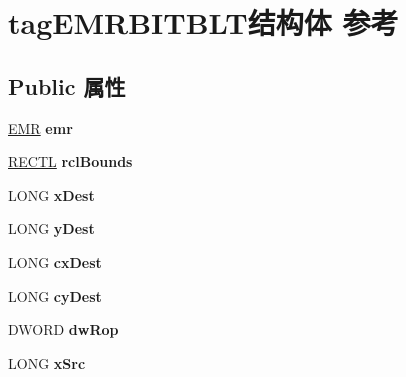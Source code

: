 \hypertarget{structtag_e_m_r_b_i_t_b_l_t}{}\section{tag\+E\+M\+R\+B\+I\+T\+B\+L\+T结构体 参考}
\label{structtag_e_m_r_b_i_t_b_l_t}
\subsection*{Public 属性}
\begin{DoxyCompactItemize}
\item 
\mbox{\label{structtag_e_m_r_b_i_t_b_l_t_a74261e410f52de9b388ad9c92cc4d5d7}} 
\hyperlink{structtag_e_m_r}{E\+MR} {\bfseries emr}
\item 
\mbox{\label{structtag_e_m_r_b_i_t_b_l_t_a687ec289cdd882b8f9afe67e27a450c8}} 
\hyperlink{struct___r_e_c_t_l}{R\+E\+C\+TL} {\bfseries rcl\+Bounds}
\item 
\mbox{\label{structtag_e_m_r_b_i_t_b_l_t_a88c92524c76b7f1d233a22b208d58c26}} 
L\+O\+NG {\bfseries x\+Dest}
\item 
\mbox{\label{structtag_e_m_r_b_i_t_b_l_t_ad5caccd657503d24453c82bacdd03692}} 
L\+O\+NG {\bfseries y\+Dest}
\item 
\mbox{\label{structtag_e_m_r_b_i_t_b_l_t_aa535e6ee99be90080e31e56526968b37}} 
L\+O\+NG {\bfseries cx\+Dest}
\item 
\mbox{\label{structtag_e_m_r_b_i_t_b_l_t_a150f48532ea1824a46e993b5bb252ba0}} 
L\+O\+NG {\bfseries cy\+Dest}
\item 
\mbox{\label{structtag_e_m_r_b_i_t_b_l_t_a21b279b7a135661a96f3dfb572843ad1}} 
D\+W\+O\+RD {\bfseries dw\+Rop}
\item 
\mbox{\label{structtag_e_m_r_b_i_t_b_l_t_a6720d0f01dba936917fcbc8ab7c12157}} 
L\+O\+NG {\bfseries x\+Src}
\item 
\mbox{\label{structtag_e_m_r_b_i_t_b_l_t_a5bd1603b1153e04f63d3c40129ebe363}} 

\end{DoxyCompactItemize}

